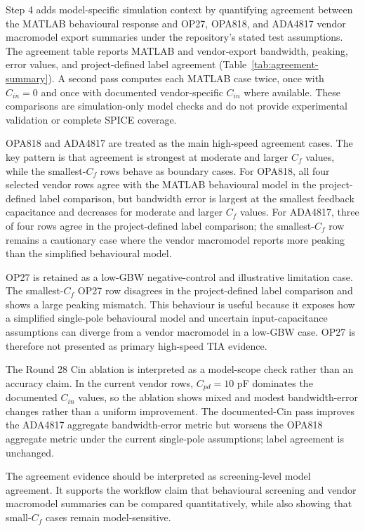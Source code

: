 Step 4 adds model-specific simulation context by quantifying agreement between the MATLAB behavioural response and OP27, OPA818, and ADA4817 vendor macromodel export summaries under the repository's stated test assumptions. The agreement table reports MATLAB and vendor-export bandwidth, peaking, error values, and project-defined label agreement (Table~\ref{tab:agreement-summary}). A second pass computes each MATLAB case twice, once with $C_{in}=0$ and once with documented vendor-specific $C_{in}$ where available. These comparisons are simulation-only model checks and do not provide experimental validation or complete SPICE coverage.

OPA818 and ADA4817 are treated as the main high-speed agreement cases. The key pattern is that agreement is strongest at moderate and larger $C_f$ values, while the smallest-$C_f$ rows behave as boundary cases. For OPA818, all four selected vendor rows agree with the MATLAB behavioural model in the project-defined label comparison, but bandwidth error is largest at the smallest feedback capacitance and decreases for moderate and larger $C_f$ values. For ADA4817, three of four rows agree in the project-defined label comparison; the smallest-$C_f$ row remains a cautionary case where the vendor macromodel reports more peaking than the simplified behavioural model.

OP27 is retained as a low-GBW negative-control and illustrative limitation case. The smallest-$C_f$ OP27 row disagrees in the project-defined label comparison and shows a large peaking mismatch. This behaviour is useful because it exposes how a simplified single-pole behavioural model and uncertain input-capacitance assumptions can diverge from a vendor macromodel in a low-GBW case. OP27 is therefore not presented as primary high-speed TIA evidence.

The Round 28 Cin ablation is interpreted as a model-scope check rather than an accuracy claim. In the current vendor rows, $C_{pd}=10$ pF dominates the documented $C_{in}$ values, so the ablation shows mixed and modest bandwidth-error changes rather than a uniform improvement. The documented-Cin pass improves the ADA4817 aggregate bandwidth-error metric but worsens the OPA818 aggregate metric under the current single-pole assumptions; label agreement is unchanged.

The agreement evidence should be interpreted as screening-level model agreement. It supports the workflow claim that behavioural screening and vendor macromodel summaries can be compared quantitatively, while also showing that small-$C_f$ cases remain model-sensitive.

